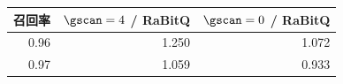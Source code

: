 \begin{tabular}{@{}rrr@{}}
\toprule
召回率 & $\gscan=4$ / RaBitQ & $\gscan=0$ / RaBitQ \\
\midrule
0.96 & 1.250 & 1.072 \\
0.97 & 1.059 & 0.933 \\
\bottomrule
\end{tabular}
